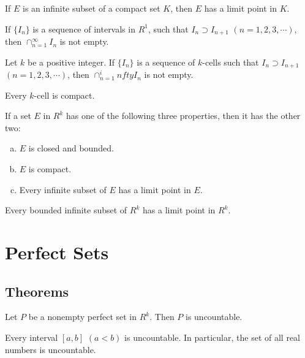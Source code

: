 \begin{theorem}
	If $E$ is an infinite subset of a compact set $K$, then $E$ has a limit point in $K$.
\end{theorem}

\begin{theorem}
	If $\{I_n\}$ is a sequence of intervals in $R^1$, such that $I_n \supset I_{n+1}$ $(n=1,2,3,\cdots)$, then $\cap_{n=1}^\infty I_n$ is not empty.
\end{theorem}

\begin{theorem}
	Let $k$ be a positive integer. If $\{I_n\}$ is a sequence of $k$-cells such that $I_n \supset I_{n+1}$ $(n=1,2,3,\cdots)$, then $\cap_{n=1}^infty I_n$ is not empty.
\end{theorem}

\begin{theorem}
	Every $k$-cell is compact.
\end{theorem}

\begin{theorem}
	If a set $E$ in $R^k$ has one of the following three properties, then it has the other two:
	\begin{enumerate}[(a)]
		\item $E$ is closed and bounded.
		\item $E$ is compact.
		\item Every infinite subset of $E$ has a limit point in $E$.
	\end{enumerate}
\end{theorem}

\begin{theorem}
	Every bounded infinite subset of $R^k$ has a limit point in $R^k$.
\end{theorem}

\section{Perfect Sets}
\subsection{Theorems}
\begin{theorem}
	Let $P$ be a nonempty perfect set in $R^k$. Then $P$ is uncountable.
\end{theorem}

\begin{corollary}
	Every interval $[a,b]$ $(a < b)$ is uncountable. In particular, the set of all real numbers is uncountable.
\end{corollary}

